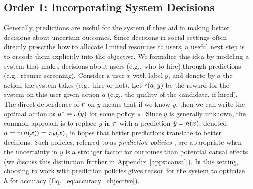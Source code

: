  
 
\subsection{Order 1: Incorporating System Decisions} \label{sec:order1}
Generally, predictions are useful for the system if they aid in making better decisions about uncertain outcomes. 
Since decisions in social settings often directly prescribe how to allocate limited resources to users,
a useful next step is to encode them explicitly into the objective.
We formalize this idea by modeling a system that makes decisions about users
(e.g., who to hire)
through predictions (e.g., resume screening).
Consider a user $x$ with label $y$, and denote by $a$ the action the system takes (e.g., hire or not).
Let ${r}(a,y)$ be the reward for the system on this user given action $a$
(e.g., the quality of the candidate, if hired).
The direct dependence of ${r}$ on $y$ means that if we know $y$, then we can write the optimal action as $a^*={\pi}(y)$ for some policy ${\pi}$.
Since $y$ is generally unknown, the common approach is to replace $y$ in ${\pi}$ with a prediction ${\hat{y}} = h(x)$,
denoted $a = {\pi}(h(x)) = {\pi}_h(x)$,
in hopes that better predictions translate to better decisions. %
Such policies,
referred to as \emph{prediction policies} \citep{kleinberg2015prediction},
are appropriate when the uncertainty in $y$ is a stronger factor for outcomes than potential causal effects (we discuss this distinction further in Appendix~\ref{appx:causal}).
In this setting, 
choosing to work with prediction policies
gives reason for the system to optimize $h$ for accuracy (Eq.~\eqref{eq:accuracy_objective}).
\squeeze

